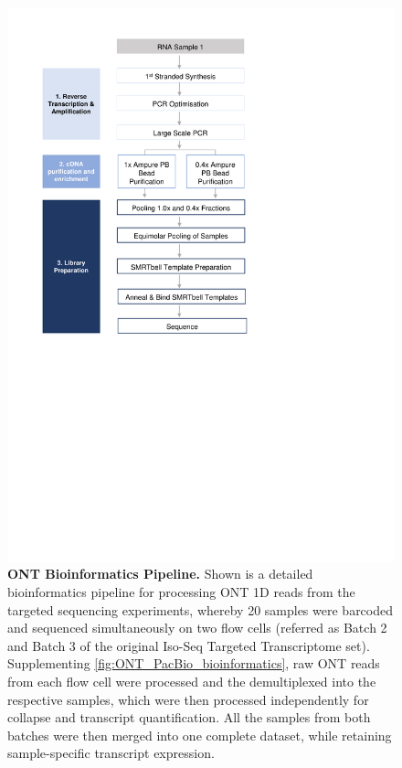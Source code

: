 \begin{figure}[htp]
	\centering
	\includegraphics[page=16,trim={0cm 8cm 0cm 0cm},clip,scale = 0.8]{Figures/ProjectDevelopment_Figures}
	\captionsetup{width=0.95\textwidth,singlelinecheck=off}
	\caption[ONT Bioinformatics Pipeline]%
	{\textbf{ONT Bioinformatics Pipeline.} Shown is a detailed bioinformatics pipeline for processing ONT 1D reads from the targeted sequencing experiments, whereby 20 samples were barcoded and sequenced simultaneously on two flow cells (referred as Batch 2 and Batch 3 of the original Iso-Seq Targeted Transcriptome set). Supplementing \cref{fig:ONT_PacBio_bioinformatics}, raw ONT reads from each flow cell were processed and the demultiplexed into the respective samples, which were then processed independently for collapse and transcript quantification. All the samples from both batches were then merged into one complete dataset, while retaining sample-specific transcript expression. 
	}
	\label{fig:ONT_Targeted_bioinformatics}
\end{figure}

